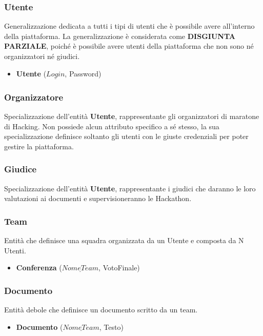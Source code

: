 \documentclass[a4paper, 10pt]{article}
\begin{document}
	\subsubsection{Utente}
	Generalizzazione dedicata a tutti i tipi di utenti che è possibile avere all'interno della piattaforma.
	La generalizzazione è considerata come \textbf{DISGIUNTA PARZIALE}, poiché è possibile avere utenti della piattaforma che non sono né organizzatori né giudici.
	\begin{itemize}
		\item \textbf{Utente} ($\underline{Login}$, Password)
	\end{itemize}
	\subsubsection{Organizzatore}
	Specializzazione dell'entità \textbf{Utente}, rappresentante gli organizzatori di maratone di Hacking.
	Non possiede alcun attributo specifico a sé stesso, la sua specializzazione definisce soltanto gli utenti con le giuste credenziali per poter gestire la piattaforma.
	\subsubsection{Giudice}
	Specializzazione dell'entità \textbf{Utente}, rappresentante i giudici che daranno le loro valutazioni ai documenti e supervisioneranno le Hackathon.
	\subsubsection{Team}
	Entità che definisce una squadra organizzata da un Utente e composta da N Utenti.
	\begin{itemize}
		\item \textbf{Conferenza} ($\underline{NomeTeam}$, VotoFinale)
	\end{itemize}
	\subsubsection{Documento}
	Entità debole che definisce un documento scritto da un team.
	\begin{itemize}
		\item \textbf{Documento} ($\underline{NomeTeam}$, Testo)
	\end{itemize}
\end{document}
